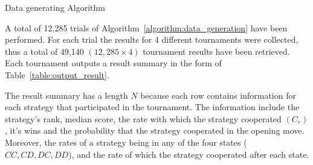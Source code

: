 \documentclass{article}
\begin{document}
\begin{algorithm}[!htbp]
    \;
    \caption{Data generating Algorithm}
    \label{algorithm:data_generation}
\end{algorithm}

A total of 12,285 trials of Algorithm~\ref{algorithm:data_generation} have been
performed. For each trial the results for 4 different tournaments were collected,
thus a total of 49,140 $(12,285 \times 4)$ tournament results have been
retrieved. Each tournament outputs a result summary in the form of
Table~\ref{table:output_result}.

The result summary has a length \(N\) because each row contains information for
each strategy that participated in the tournament. The information include the
strategy's rank, median score, the rate with which the strategy cooperated
$(C_r)$, it's wins and the probability that the strategy cooperated in the
opening move. Moreover, the rates of a strategy being in any of the four states
($CC, CD, DC, DD$), and the rate of which the strategy cooperated after each
state.
\end{document}
